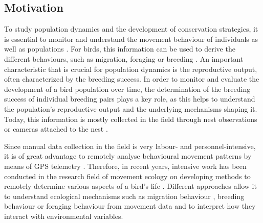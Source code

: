 \subsection{Motivation}
To study population dynamics and the development of conservation strategies, it is essential to monitor and understand the movement behaviour of individuals as well as populations \parencite{allen2016linking, he2022guide, morales2010building}. For birds, this information can be used to derive the different behaviours, such as migration, foraging or breeding \parencite{picardi2020analysis}. An important characteristic that is crucial for population dynamics is the reproductive output, often characterized by the breeding success. In order to monitor and evaluate the development of a bird population over time, the determination of the breeding success of individual breeding pairs plays a key role, as this helps to understand the population's reproductive output and the underlying mechanisms shaping it. Today, this information is mostly collected in the field through nest observations or cameras attached to the nest \parencite{scherler2023brutbiologie}.

Since manual data collection in the field is very labour- and personnel-intensive, it is of great advantage to remotely analyse behavioural movement patterns by means of GPS telemetry \parencite{kays2015terrestrial, williams2020optimizing}. Therefore, in recent years, intensive work has been conducted in the research field of movement ecology on developing methods to remotely determine various aspects of a bird's life \parencite{bowgen2022curves, berger2015recursive, bracis2018revisit, gurarie2016what, joo2020navigating, kane2022understanding, morales2010building, picardi2020analysis, schreven2021nesting}. Different approaches allow it to understand ecological mechanisms such as migration behaviour \parencite{garcia2022seasonal, maciorowski2019autumn}, breeding behaviour \parencite{picardi2020analysis} or foraging behaviour \parencite{bracis2018revisit} from movement data and to interpret how they interact with environmental variables.

